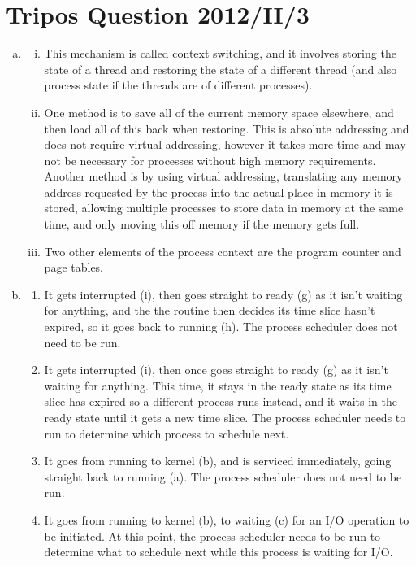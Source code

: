 \documentclass[12pt]{article}
\begin{document}
\section{Tripos Question 2012/II/3}
\begin{enumerate}[(a)]
      \item \begin{enumerate}[(i)]
                  \item This mechanism is called context switching, and it involves storing the state of a thread and restoring the state of a different thread (and also process state if the threads are of different processes).
                  \item One method is to save all of the current memory space elsewhere, and then load all of this back when restoring. This is absolute addressing and does not require virtual addressing, however it takes more time and may not be necessary for processes without high memory requirements. Another method is by using virtual addressing, translating any memory address requested by the process into the actual place in memory it is stored, allowing multiple processes to store data in memory at the same time, and only moving this off memory if the memory gets full.
                  \item Two other elements of the process context are the program counter and page tables.
            \end{enumerate}
      \item \begin{enumerate}
                  \item It gets interrupted (i), then goes straight to ready (g) as it isn't waiting for anything, and the the routine then decides its time slice hasn't expired, so it goes back to running (h). The process scheduler does not need to be run.
                  \item It gets interrupted (i), then once goes straight to ready (g) as it isn't waiting for anything. This time, it stays in the ready state as its time slice has expired so a different process runs instead, and it waits in the ready state until it gets a new time slice. The process scheduler needs to run to determine which process to schedule next.
                  \item It goes from running to kernel (b), and is serviced immediately, going straight back to running (a). The process scheduler does not need to be run.
                  \item It goes from running to kernel (b), to waiting (c) for an I/O operation to be initiated. At this point, the process scheduler needs to be run to determine what to schedule next while this process is waiting for I/O.
            \end{enumerate}
\end{enumerate}
\end{document}
